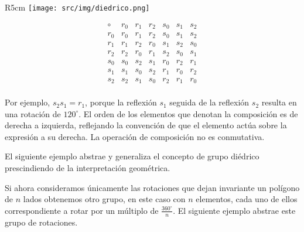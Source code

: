 \begin{wrapfigure}{R}{5cm}
    \texttt{[image: src/img/diedrico.png]}
\end{wrapfigure}

\[
\begin{array}{c|cccccc}
\circ & r_0 & r_1 & r_2 & s_0 & s_1 & s_2 \\
\hline
r_0 & r_0 & r_1 & r_2 & s_0 & s_1 & s_2 \\
r_1 & r_1 & r_2 & r_0 & s_1 & s_2 & s_0 \\
r_2 & r_2 & r_0 & r_1 & s_2 & s_0 & s_1 \\
s_0 & s_0 & s_2 & s_1 & r_0 & r_2 & r_1 \\
s_1 & s_1 & s_0 & s_2 & r_1 & r_0 & r_2 \\
s_2 & s_2 & s_1 & s_0 & r_2 & r_1 & r_0 \\
\end{array}
\]

Por ejemplo, \(s_2 s_1 = r_1\), porque la reflexión \(s_1\) seguida de la reflexión \(s_2\) resulta en una rotación de \(120^\circ\). El orden de los elementos que denotan la composición es de derecha a izquierda, reflejando la convención de que el elemento actúa sobre la expresión a su derecha. La operación de composición no es conmutativa.

\clearpage

El siguiente ejemplo abstrae y generaliza el concepto de grupo diédrico prescindiendo de la interpretación geométrica.


Si ahora consideramos únicamente las rotaciones que dejan invariante un polígono de \(n\) lados obtenemos otro grupo, en este caso con \(n\) elementos, cada uno de ellos correspondiente a rotar por un múltiplo de $\frac{360^\circ}{n}$. El siguiente ejemplo abstrae este grupo de rotaciones.


